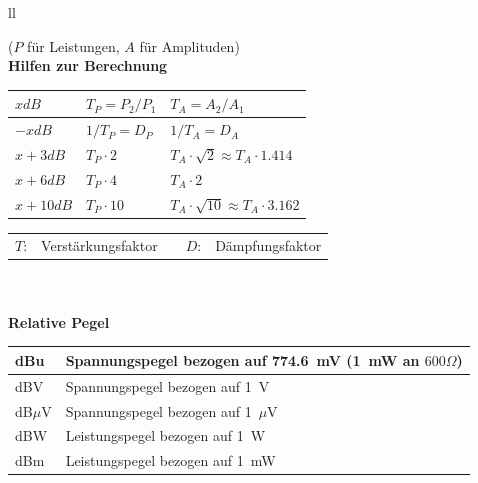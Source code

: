 \begin{tabular}{ll}
{\small{($P$ für Leistungen, $A$ für Amplituden)}
\\ 

\textbf{Hilfen zur Berechnung}\\
\begin{tabular}{|l|ll|}
\hline
$x dB$	& $T_P=P_2/P_1$ &$T_A=A_2/A_1$ \\
\hline
$-x dB$	& $1/T_P = D_P$	& $1/T_A = D_A$\\
$x+3dB$	& $T_P \cdot 2$	& $T_A \cdot \sqrt{2} \approx T_A \cdot 1.414$ \\
$x+6dB$ & $T_P \cdot 4$ & $T_A \cdot 2$ \\
$x+10dB$	& $T_P \cdot 10$ & $T_A \cdot \sqrt{10} \approx T_A \cdot 3.162$\\
\hline
\end{tabular}
\begin{tabular}{lllll}
  $T$: & Verstärkungsfaktor & &
  $D$: & Dämpfungsfaktor
\end{tabular}
\\ \\

\textbf{Relative Pegel}\\
\begin{tabular}{|l|l|}
  \hline
    dBu & Spannungspegel bezogen auf 774.6~mV (1~mW an $600\Omega$)\\
  \hline
  \hline
    dBV & Spannungspegel bezogen auf 1~V\\
  \hline
    dB$\mu$V & Spannungspegel bezogen auf 1~$\mu$V\\
  \hline
    dBW & Leistungspegel bezogen auf 1~W\\
  \hline
    dBm & Leistungspegel bezogen auf 1~mW\\
  \hline
\end{tabular}

}
\end{tabular}
\newpage

